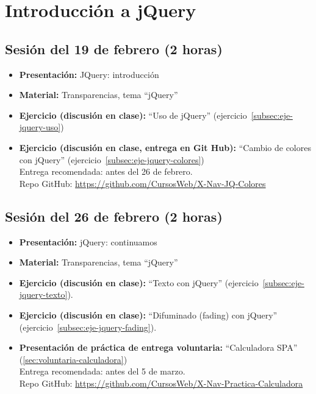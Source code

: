\documentclass[a4paper,12pt]{report}
\begin{document}
\section{Introducción a jQuery}

\subsection{Sesión del 19 de febrero (2 horas)}

\begin{itemize}
\item \textbf{Presentación:} JQuery: introducción
\item \textbf{Material:} Transparencias, tema ``jQuery''
\item \textbf{Ejercicio (discusión en clase):} ``Uso de jQuery'' (ejercicio~\ref{subsec:eje-jquery-uso})
\item \textbf{Ejercicio (discusión en clase, entrega en Git Hub):} ``Cambio de colores con jQuery'' (ejercicio~\ref{subsec:eje-jquery-colores}) \\
  Entrega recomendada: antes del 26 de febrero.  \\
  Repo GitHub: \url{https://github.com/CursosWeb/X-Nav-JQ-Colores} \\
\end{itemize}

\subsection{Sesión del 26 de febrero (2 horas)}

\begin{itemize}
\item \textbf{Presentación:} jQuery: continuamos
\item \textbf{Material:} Transparencias, tema ``jQuery''
\item \textbf{Ejercicio (discusión en clase):} ``Texto con jQuery'' (ejercicio~\ref{subsec:eje-jquery-texto}).
\item \textbf{Ejercicio (discusión en clase):} ``Difuminado (fading) con jQuery'' (ejercicio~\ref{subsec:eje-jquery-fading}).
\item \textbf{Presentación de práctica de entrega voluntaria:} ``Calculadora SPA'' (\ref{sec:voluntaria-calculadora}) \\
  Entrega recomendada: antes del 5 de marzo. \\
  Repo GitHub: \url{https://github.com/CursosWeb/X-Nav-Practica-Calculadora} \\
\end{itemize}
\end{document}
